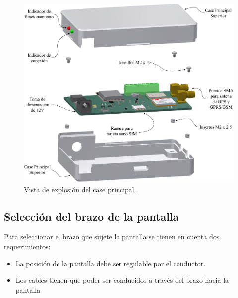 \newpage
\begin{figure}[hbt!]
\centering
\includegraphics[width=\textwidth]{exploded.pdf}
\caption{Vista de explosión del case principal.}
\label{fig:exploded}
\end{figure}





\subsection{Selección del brazo de la pantalla}

Para seleccionar el brazo que sujete la pantalla se tienen en cuenta dos requerimientos:
\vspace{-3mm}
\begin{itemize}
    \itemsep0pt
    \item La posición de la pantalla debe ser regulable por el conductor.
    \item Los cables tienen que poder ser conducidos a través del brazo hacia la pantalla
\end{itemize}

